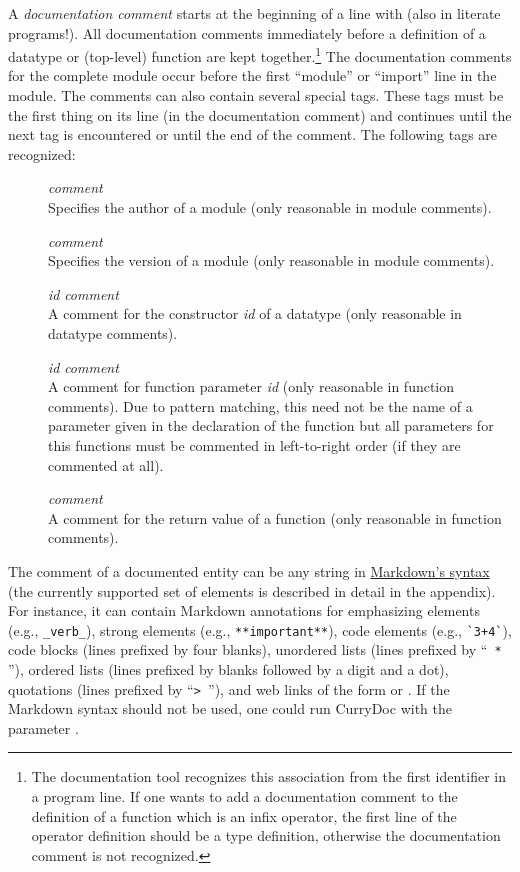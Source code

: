 A \emph{documentation comment}%
starts at the beginning of a line
with \ccode{--- }\pindex{---} (also in literate programs!).
All documentation comments immediately before a
definition of a datatype or (top-level) function are kept together.\footnote{%
The documentation tool recognizes this association from the first identifier
in a program line. If one wants to add a documentation comment
to the definition of a function which is an infix operator,
the first line of the operator definition should be a type definition,
otherwise the documentation comment is not recognized.}
The documentation comments for the complete module occur before
the first ``module'' or ``import'' line in the module.
The comments can also contain several special tags. These tags
must be the first thing on its line (in the documentation comment)
and continues until the next tag is encountered or until the
end of the comment. The following tags are recognized:
\begin{description}
\item[] \emph{comment}\\
Specifies the author of a module (only reasonable in module comments).
\item[] \emph{comment}\\
Specifies the version of a module (only reasonable in module comments).
\item[] \emph{id} \emph{comment}\\
A comment for the constructor \emph{id} of a datatype
(only reasonable in datatype comments).
\item[] \emph{id} \emph{comment}\\
A comment for function parameter \emph{id}
(only reasonable in function comments).
Due to pattern matching, this need not be the name of a parameter
given in the declaration of the function but all parameters
for this functions must be commented in left-to-right order
(if they are commented at all).
\item[] \emph{comment}\\
A comment for the return value of a function
(only reasonable in function comments).
\end{description}
The comment of a documented entity can be any string in
\href{http://en.wikipedia.org/wiki/Markdown}{Markdown's syntax}
(the currently supported set of elements
is described in detail in the appendix).
For instance, it can contain Markdown annotations for
emphasizing elements (e.g., \verb!_verb_!),
strong elements (e.g., \verb!**important**!),
code elements (e.g., \verb!`3+4`!), code blocks (lines prefixed by four blanks),
unordered lists (lines prefixed by  ``\verb! * !''),
ordered lists (lines prefixed by blanks followed by a digit and a dot),
quotations (lines prefixed by ``\verb!> !''),
and web links of the form 
or .
If the Markdown syntax should not be used, one could run CurryDoc
with the parameter .

